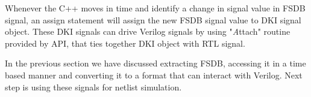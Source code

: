 Whenever the C++ moves in time and identify a change in signal value in FSDB signal, an assign statement will assign the new FSDB signal value to DKI signal object.  These DKI signals can drive Verilog signals by using "{\emph Attach}" routine provided by API, that ties together DKI object with RTL signal. 

In the previous section we have discussed extracting FSDB, accessing it in a time based manner and converting it to a format that can interact with Verilog. Next step is using these signals for netlist simulation.

